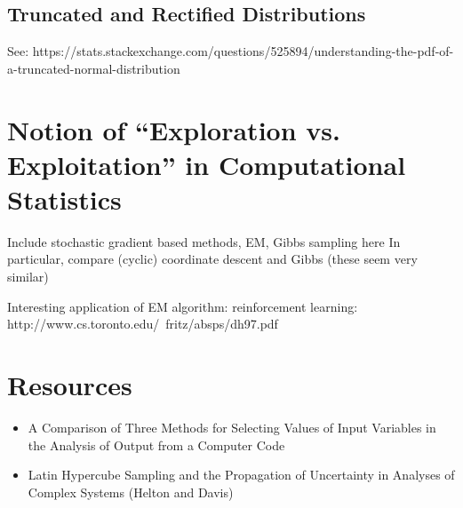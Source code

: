\documentclass[12pt]{article}
\begin{document}
\subsection{Truncated and Rectified Distributions}
See: https://stats.stackexchange.com/questions/525894/understanding-the-pdf-of-a-truncated-normal-distribution



\section{Notion of ``Exploration vs. Exploitation'' in Computational Statistics}
Include stochastic gradient based methods, EM, Gibbs sampling here 
In particular, compare (cyclic) coordinate descent and Gibbs (these seem very similar) 

Interesting application of EM algorithm: reinforcement learning: 
http://www.cs.toronto.edu/~fritz/absps/dh97.pdf

\section{Resources}
\begin{itemize}
\item A Comparison of Three Methods for Selecting Values of Input Variables in the Analysis of Output from a Computer Code 
\item Latin Hypercube Sampling and the Propagation of Uncertainty in Analyses of Complex Systems (Helton and Davis)
\end{itemize}
\end{document}
